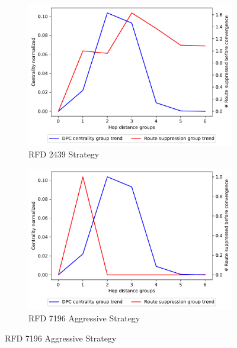 \begin{figure}[h]
     \centering
     \begin{subfigure}[b]{0.325\textwidth}
         \centering
         \includegraphics[width=\textwidth]{images/RFD/miceVSelephants/elephants/cisco_1000_RFD_nodeConvergence_centVSsup_trend.pdf}
         \caption{RFD 2439 Strategy}
         \label{fig:1000_2439RFD_cent_VS_sup_elephants}
     \end{subfigure}
     \hfill
     \begin{subfigure}[b]{0.325\textwidth}
         \centering
         \includegraphics[width=\textwidth]{images/RFD/miceVSelephants/elephants/cisco_1000_RFD_7196_aggressive_nodeConvergence_centVSsup_trend.pdf}
         \caption{RFD 7196 Aggressive Strategy}
         \label{fig:1000_7196RFDA_cent_VS_sup_elephants}
     \end{subfigure}

\end{figure}

